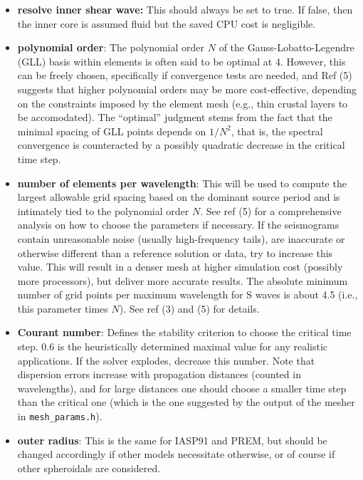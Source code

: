 \documentclass[11pt,letter,fleqn,english,notitlepage]{article}
\begin{document}
\begin{itemize}
\item \textbf{resolve inner shear wave:} This should always be set to true. If false, then the inner core 
is assumed fluid but the saved CPU cost is negligible.

\item \textbf{polynomial order}: The polynomial order $N$ of the Gauss-Lobatto-Legendre (GLL) basis 
within elements
is often said to be optimal at 4. However, this can be freely chosen, specifically if convergence tests are needed,
and Ref (5) suggests that higher polynomial orders may be more cost-effective, depending on the constraints 
imposed by the element mesh (e.g., thin crustal layers to be accomodated). The ``optimal'' judgment stems 
from the fact that the minimal spacing of GLL points depends on $1/N^2$, that is, the spectral convergence 
is counteracted by a possibly quadratic decrease in the critical time step.

\item \textbf{number of elements per wavelength}: This will be used to compute the largest
allowable grid spacing based on the dominant source period and is intimately 
tied to the polynomial order $N$. See ref (5) for 
a comprehensive analysis on how to choose the parameters if necessary.
If the seismograms contain unreasonable noise (usually high-frequency tails), 
are inaccurate or otherwise different than a reference solution or data, 
try to increase this value. This will result in a denser mesh at higher 
simulation cost (possibly more processors), but deliver more accurate results. 
The absolute minimum number of grid points per maximum wavelength for S waves 
is about 4.5 (i.e., this parameter times $N$). See ref (3) and (5) for details.

\item \textbf{Courant number}: Defines the stability criterion to choose the critical time step.
0.6 is the heuristically determined maximal value for any realistic 
applications. If the solver explodes, decrease this number. Note that dispersion errors increase 
with propagation distances (counted in wavelengths), and for large distances one should  
choose a smaller time step than the critical one (which is the one suggested by 
the output of the mesher in {\tt mesh\_params.h}).

\item \textbf{outer radius}: This is the same for IASP91 and PREM, but should be changed accordingly 
if other models necessitate otherwise, or of course if other spheroidals are considered. 


\end{itemize}
\end{document}
